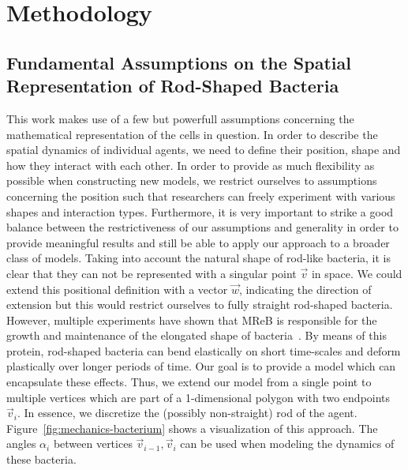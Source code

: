 \documentclass{article}
\begin{document}

\section{Methodology}
\subsection{Fundamental Assumptions on the Spatial Representation of Rod-Shaped Bacteria}
This work makes use of a few but powerfull assumptions concerning the mathematical representation of
the cells in question.
In order to describe the spatial dynamics of individual agents, we need to define their position,
shape and how they interact with each other.
In order to provide as much flexibility as possible when constructing new models, we restrict
ourselves to assumptions concerning the position such that researchers can freely experiment with
various shapes and interaction types.
Furthermore, it is very important to strike a good balance between the restrictiveness of our
assumptions and generality in order to provide meaningful results and still be able to apply our
approach to a broader class of models.
Taking into account the natural shape of rod-like bacteria, it is clear that they can not be
represented with a singular point $\vec{v}$ in space.
We could extend this positional definition with a vector $\vec{w}$, indicating the direction of
extension but this would restrict ourselves to fully straight rod-shaped bacteria.
However, multiple experiments have shown that MReB is responsible for the growth and maintenance of
the elongated shape of bacteria~\cite{Erickson2001}.
By means of this protein, rod-shaped bacteria can bend elastically on short time-scales and
deform plastically over longer periods of time.
Our goal is to provide a model which can encapsulate these effects.
Thus, we extend our model from a single point to multiple vertices which are part of a 1-dimensional
polygon with two endpoints $\vec{v}_i$.
In essence, we discretize the (possibly non-straight) rod of the agent.
Figure~\ref{fig:mechanics-bacterium} shows a visualization of this approach.
The angles $\alpha_i$ between vertices $\vec{v}_{i-1},\vec{v}_i$ can be used when modeling the
dynamics of these bacteria.
\end{document}
